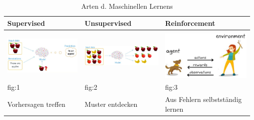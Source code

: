 \documentclass[12pt,titlepage]{article}
\begin{document}
\begin{table}
[ht] \caption{Arten d. Maschinellen Lernens} \label{tab:ArtdML}
\begin{tabular}{p{}|p{}|p{}}
Supervised & Unsupervised & Reinforcement \\
\hline
&&\\
\includegraphics[width=4.7cm]{sup.png} & \includegraphics[width=4.7cm]{unsuper.png}  & \includegraphics[width=4.6cm]{re.png} \\
fig:1 & fig:2 & fig:3\\
\hline
Vorhersagen treffen & Muster entdecken & Aus Fehlern selbstständig lernen
\end{tabular}
\end{table}
\end{document}
